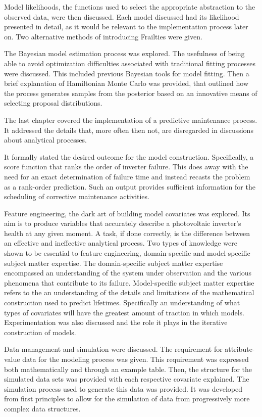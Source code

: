 Model likelihoods, the functions used to select the appropriate abstraction to the observed data, were then discussed. Each model discussed had its likelihood presented in detail, as it would be relevant to the implementation process later on. Two alternative methods of introducing Frailties were given. 

The Bayesian model estimation process was explored. The usefulness of being able to avoid optimization difficulties associated with traditional fitting processes were discussed. This included previous Bayesian tools for model fitting. Then a brief explanation of Hamiltonian Monte Carlo was provided, that outlined how the process generates samples from the posterior based on an innovative means of selecting proposal distributions.

The last chapter covered the implementation of a predictive maintenance process. It addressed the details that, more often then not, are disregarded in discussions about analytical processes. 

It formally stated the desired outcome for the model construction. Specifically, a score function that ranks the order of inverter failure. This does away with the need for an exact determination of failure time and instead recasts the problem as a rank-order prediction. Such an output provides sufficient information for the scheduling of corrective maintenance activities. 

Feature engineering, the dark art of building model covariates was explored. Its aim is to produce variables that accurately describe a photovoltaic inverter's health at any given moment. A task, if done correctly, is the difference between an effective and ineffective analytical process. Two types of knowledge were shown to be essential to feature engineering, domain-specific and model-specific subject matter expertise. The domain-specific subject matter expertise encompassed an understanding of the system under observation and the various phenomena that contribute to its failure. Model-specific subject matter expertise refers to the an understanding of the details and limitations of the mathematical construction used to predict lifetimes. Specifically an understanding of what types of covariates will have the greatest amount of traction in which models. Experimentation was also discussed and the role it plays in the iterative construction of models.

Data management and simulation were discussed. The requirement for attribute-value data for the modeling process was given. This requirement was expressed both mathematically and through an example table. Then, the structure for the simulated data sets was provided with each respective covariate explained. The simulation process used to generate this data was provided. It was developed from first principles to allow for the simulation of data from progressively more complex data structures. 

